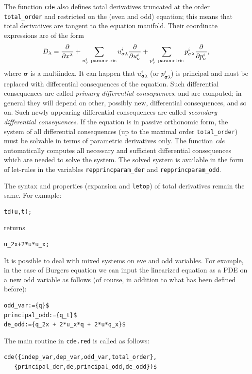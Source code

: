 The function \texttt{cde} also defines total derivatives truncated at the order
\texttt{total\_order} and restricted on the (even and odd) equation; this means
that total derivatives are tangent to the equation manifold. Their coordinate
expressions are of the form
\begin{equation}
  D_\lambda=\pd{}{x^\lambda}+\sum_{u^i_{\mathbf{\sigma}}\
    \text{parametric}}u^i_{\mathbf{\sigma}\lambda}\pd{}{u^i_{\mathbf{\sigma}}}
  + \sum_{p^i_{\mathbf{\sigma}}\
    \text{parametric}}p^i_{\mathbf{\sigma}\lambda}\pd{}{p^i_{\mathbf{\sigma}}},
\end{equation}
where $\mathbf{\sigma}$ is a multiindex.  It can happen that
$u^i_{\mathbf{\sigma}\lambda}$ (or $p^i_{\mathbf{\sigma}\lambda}$) is
principal and must be replaced with differential consequences of the equation.
Such differential consequences are called \emph{primary differential
  consequences}, and are computed; in general they will depend on other,
possibly new, differential consequences, and so on. Such newly appearing
differential consequences are called \emph{secondary differential
  consequences}. If the equation is in passive orthonomic form, the system of
all differential consequences (up to the maximal order \texttt{total\_order})
must be solvable in terms of parametric derivatives only. The function
\emph{cde} automatically computes all necessary and sufficient differential
consequences which are needed to solve the system. The solved system is
available in the form of \REDUCE let-rules in the variables
\texttt{repprincparam\_der} and \texttt{repprincparam\_odd}.
\ttindextype[CDE]{repprincparam\_odd}{shared global variable}
\hypertarget{variable:REPPRINCPARAM_DER}{}
\hypertarget{variable:REPPRINCPARAM_ODD}{}

The syntax and properties (expansion and \texttt{letop}) of total derivatives
remain the same. For exmaple:
\begin{verbatim}
td(u,t);
\end{verbatim}
returns
\begin{verbatim}
u_2x+2*u*u_x;
\end{verbatim}

It is possible to deal with mixed systems on eve and odd variables. For
example, in the case of Burgers equation we can input the linearized equation
as a PDE on a new odd variable as follows (of course, in addition to what has
been defined before):
\begin{verbatim}
odd_var:={q}$
principal_odd:={q_t}$
de_odd:={q_2x + 2*u_x*q + 2*u*q_x}$
\end{verbatim}
The main routine in \texttt{cde.red} is called as follows:
\begin{verbatim}
cde({indep_var,dep_var,odd_var,total_order},
   {principal_der,de,principal_odd,de_odd})$
\end{verbatim}

